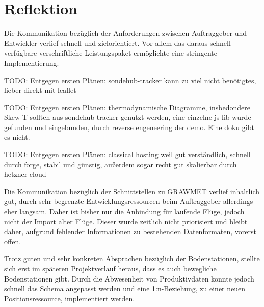 \section{Reflektion}
Die Kommunikation bezüglich der Anforderungen zwischen Auftraggeber und Entwickler verlief schnell und zielorientiert.
Vor allem das daraus schnell verfügbare verschriftliche Leistungspaket ermöglichte eine stringente Implementierung.

TODO: Entgegen ersten Plänen: sondehub-tracker kann zu viel nicht benötigtes, lieber direkt mit leaflet

TODO: Entgegen ersten Plänen: thermodynamische Diagramme, insbedondere Skew-T sollten aus sondehub-tracker genutzt werden, eine einzelne js lib wurde gefunden und eingebunden, durch reverse engeneering der demo. Eine doku gibt es nicht.

TODO: Entgegen ersten Plänen: classical hosting weil gut verständlich, schnell durch forge, stabil und günstig, außerdem sogar recht gut skalierbar durch hetzner cloud

Die Kommunikation bezüglich der Schnittstellen zu GRAWMET verlief inhaltlich gut, durch sehr begrenzte Entwicklungsressourcen beim Auftraggeber allerdings eher langsam.
Daher ist bisher nur die Anbindung für laufende Flüge, jedoch nicht der Import alter Flüge.
Dieser wurde zeitlich nicht priorisiert und bleibt daher, aufgrund fehlender Informationen zu bestehenden Datenformaten, vorerst offen.

Trotz guten und sehr konkreten Absprachen bezüglich der Bodenstationen, stellte sich erst im späteren Projektverlauf heraus, dass es auch bewegliche Bodenstationen gibt.
Durch die Abwesenheit von Produktivdaten konnte jedoch schnell das Schema angepasst werden und eine 1:n-Beziehung, zu einer neuen Positionsressource, implementiert werden.
